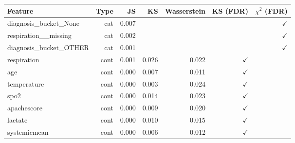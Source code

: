\begin{tabular}{lrrrrrr}
\toprule
Feature & Type & JS & KS & Wasserstein & KS (FDR) & $\chi^2$ (FDR) \\
\midrule
diagnosis_bucket_None & cat & 0.007 &  &  &  & $\checkmark$ \\
respiration__missing & cat & 0.002 &  &  &  & $\checkmark$ \\
diagnosis_bucket_OTHER & cat & 0.001 &  &  &  & $\checkmark$ \\
respiration & cont & 0.001 & 0.026 & 0.022 & $\checkmark$ &  \\
age & cont & 0.000 & 0.007 & 0.011 & $\checkmark$ &  \\
temperature & cont & 0.000 & 0.003 & 0.024 & $\checkmark$ &  \\
spo2 & cont & 0.000 & 0.014 & 0.023 & $\checkmark$ &  \\
apachescore & cont & 0.000 & 0.009 & 0.020 & $\checkmark$ &  \\
lactate & cont & 0.000 & 0.010 & 0.015 & $\checkmark$ &  \\
systemicmean & cont & 0.000 & 0.006 & 0.012 & $\checkmark$ &  \\
\bottomrule
\end{tabular}
